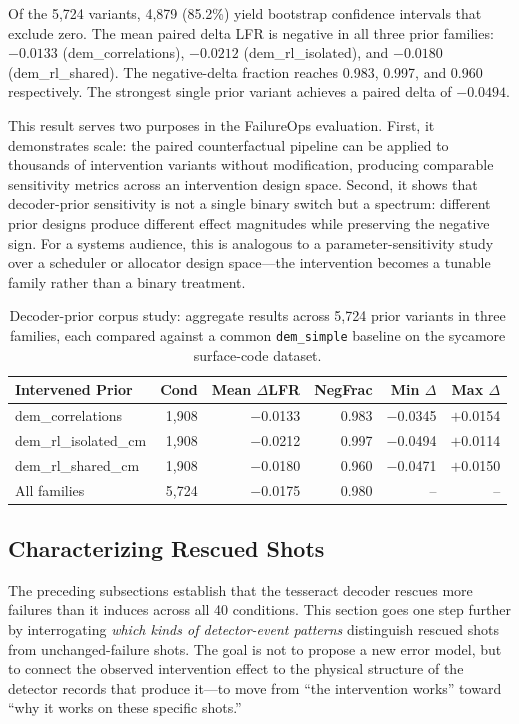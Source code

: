 Of the 5,724 variants, 4,879 (85.2\%) yield bootstrap confidence intervals that exclude zero. The mean paired delta LFR is negative in all three prior families: $-0.0133$ (dem\_correlations), $-0.0212$ (dem\_rl\_isolated), and $-0.0180$ (dem\_rl\_shared). The negative-delta fraction reaches 0.983, 0.997, and 0.960 respectively. The strongest single prior variant achieves a paired delta of $-0.0494$.

This result serves two purposes in the FailureOps evaluation. First, it demonstrates scale: the paired counterfactual pipeline can be applied to thousands of intervention variants without modification, producing comparable sensitivity metrics across an intervention design space. Second, it shows that decoder-prior sensitivity is not a single binary switch but a spectrum: different prior designs produce different effect magnitudes while preserving the negative sign. For a systems audience, this is analogous to a parameter-sensitivity study over a scheduler or allocator design space---the intervention becomes a tunable family rather than a binary treatment.

\begin{table}[t]
\centering
\caption{Decoder-prior corpus study: aggregate results across 5,724 prior variants in three families, each compared against a common \texttt{dem\_simple} baseline on the sycamore surface-code dataset.}
\label{tab:prior_corpus}
\footnotesize
\begin{tabular}{lrrrrr}
\toprule
Intervened Prior & Cond & Mean $\Delta$LFR & NegFrac & Min $\Delta$ & Max $\Delta$ \\
\midrule
dem\_correlations & 1,908 & $-$0.0133 & 0.983 & $-$0.0345 & $+$0.0154 \\
dem\_rl\_isolated\_cm & 1,908 & $-$0.0212 & 0.997 & $-$0.0494 & $+$0.0114 \\
dem\_rl\_shared\_cm & 1,908 & $-$0.0180 & 0.960 & $-$0.0471 & $+$0.0150 \\
\midrule
All families & 5,724 & $-$0.0175 & 0.980 & -- & -- \\
\bottomrule
\end{tabular}
\end{table}

\subsection{Characterizing Rescued Shots}
\label{sec:rescued_shot_analysis}

The preceding subsections establish that the tesseract decoder rescues more failures than it induces across all 40 conditions. This section goes one step further by interrogating \emph{which kinds of detector-event patterns} distinguish rescued shots from unchanged-failure shots. The goal is not to propose a new error model, but to connect the observed intervention effect to the physical structure of the detector records that produce it---to move from ``the intervention works'' toward ``why it works on these specific shots.''

